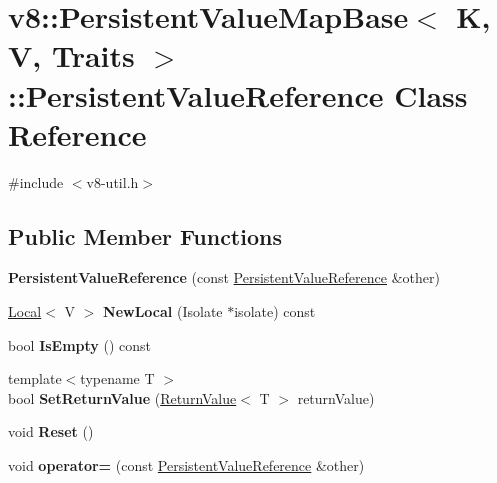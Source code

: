 \hypertarget{classv8_1_1PersistentValueMapBase_1_1PersistentValueReference}{}\section{v8\+:\+:Persistent\+Value\+Map\+Base$<$ K, V, Traits $>$\+:\+:Persistent\+Value\+Reference Class Reference}
\label{classv8_1_1PersistentValueMapBase_1_1PersistentValueReference}


{\ttfamily \#include $<$v8-\/util.\+h$>$}

\subsection*{Public Member Functions}
\begin{DoxyCompactItemize}
\item 
\mbox{\label{classv8_1_1PersistentValueMapBase_1_1PersistentValueReference_a47103822e6717eb42de116ddc773e334}} 
{\bfseries Persistent\+Value\+Reference} (const \mbox{\hyperlink{classv8_1_1PersistentValueMapBase_1_1PersistentValueReference}{Persistent\+Value\+Reference}} \&other)
\item 
\mbox{\label{classv8_1_1PersistentValueMapBase_1_1PersistentValueReference_ac59d20538e1986a423605b013f33e040}} 
\mbox{\hyperlink{classv8_1_1Local}{Local}}$<$ V $>$ {\bfseries New\+Local} (Isolate $\ast$isolate) const
\item 
\mbox{\label{classv8_1_1PersistentValueMapBase_1_1PersistentValueReference_a55c42303f4e2fa46c8de51cd8cf454d7}} 
bool {\bfseries Is\+Empty} () const
\item 
\mbox{\label{classv8_1_1PersistentValueMapBase_1_1PersistentValueReference_a4003b2d7d0f3cc84574d2e74a1713f27}} 
{\footnotesize template$<$typename T $>$ }\\bool {\bfseries Set\+Return\+Value} (\mbox{\hyperlink{classv8_1_1ReturnValue}{Return\+Value}}$<$ T $>$ return\+Value)
\item 
\mbox{\label{classv8_1_1PersistentValueMapBase_1_1PersistentValueReference_a94c91d959beb24cad37458b2ae43a97b}} 
void {\bfseries Reset} ()
\item 
\mbox{\label{classv8_1_1PersistentValueMapBase_1_1PersistentValueReference_abcbf6c9229d0b322c64fe5110726c421}} 
void {\bfseries operator=} (const \mbox{\hyperlink{classv8_1_1PersistentValueMapBase_1_1PersistentValueReference}{Persistent\+Value\+Reference}} \&other)
\end{DoxyCompactItemize}
